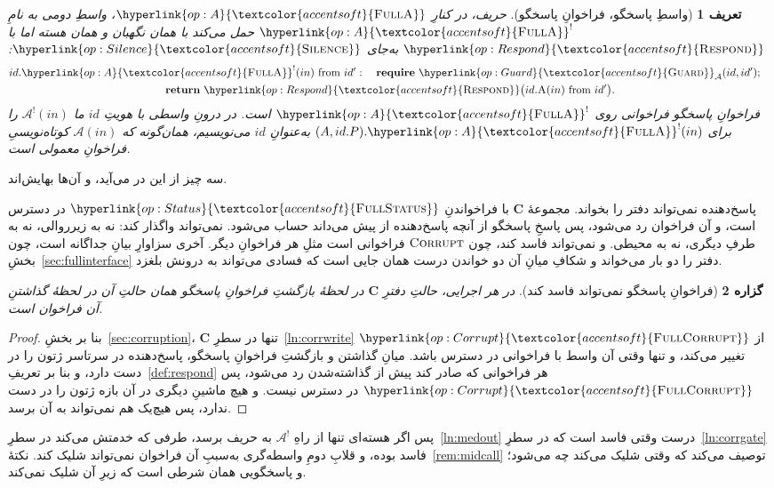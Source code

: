 \documentclass[10pt,oneside,openany]{book}
\newcommand{\Cs}{\mathbf{C}}
\newcommand{\Adv}{\mathcal{A}}
\newcommand{\op}[1]{\textnormal{\textsc{#1}}}
\newcommand{\opl}[1]{\hyperlink{op:#1}{\textcolor{accentsoft}{\op{#1}}}}
\newcommand{\fopl}[1]{\hyperlink{op:#1}{\textcolor{accentsoft}{\op{Full}\op{#1}}}}
\newcommand{\id}{id}
\theoremstyle{accentdef}
\newtheorem{definition}{تعریف}[chapter]
\theoremstyle{accentplain}
\newtheorem{proposition}[definition]{گزاره}
\begin{document}
\begin{definition}[واسطِ پاسخگو، فراخوانِ پاسخگو]\label{def:respcall}
حریف، در کنارِ $\fopl{A}$، واسطِ دومی به نامِ $\fopl{A}^{!}$ حمل می‌کند با
همان نگهبان و همان هسته اما با $\opl{Respond}$ به‌جای $\opl{Silence}$:
\[
  \begin{gathered}
  \id.\fopl{A}^{!}(in) \text{ from } \id'
  :\quad
  \textbf{require}\ \opl{Guard}_{\Adv}(\id,\id') ;\quad \\
  \textbf{return}\ \opl{Respond}\bigl(\id.\op{A}(in) \text{ from } \id'\bigr) .
  \end{gathered}
\]
\emph{فراخوانِ پاسخگو} فراخوانی روی $\fopl{A}^{!}$ است. در درونِ واسطی با
هویتِ $\id$ ما $\Adv^{!}(in)$ را برای $(A,\id.P).\fopl{A}^{!}(in)$ به‌عنوانِ
$\id$ می‌نویسیم، همان‌گونه که $\Adv(in)$ کوتاه‌نویسیِ فراخوانِ معمولی است.
\end{definition}

سه چیز از این در می‌آید، و آن‌ها بهایش‌اند.

پاسخ‌دهنده نمی‌تواند دفتر را بخواند. مجموعهٔ $\Cs$ با فراخواندنِ
$\fopl{Status}$ در دسترس است، و آن فراخوان رد می‌شود، پس پاسخِ پاسخگو از
آنچه پاسخ‌دهنده از پیش می‌داند حساب می‌شود. نمی‌تواند واگذار کند: نه به
زیرروالی، نه به طرفِ دیگری، نه به محیطی. و نمی‌تواند فاسد کند، چون
$\op{Corrupt}$ فراخوانی است مثلِ هر فراخوانِ دیگر. آخری سزاوارِ بیانِ
جداگانه است، چون بخشِ~\ref{sec:fullinterface} دفتر را دو بار می‌خواند و
شکافِ میانِ آن دو خواندن درست همان جایی است که فسادی می‌تواند به درونش
بلغزد.

\begin{proposition}[فراخوانِ پاسخگو نمی‌تواند فاسد کند]\label{prop:respcorr}
در هر اجرایی، حالتِ دفترِ $\Cs$ در لحظهٔ بازگشتِ فراخوانِ پاسخگو همان حالتِ
آن در لحظهٔ گذاشتنِ آن فراخوان است.
\end{proposition}

\begin{proof}
بنا بر بخشِ~\ref{sec:corruption}، $\Cs$ تنها در سطرِ~\ref{ln:corrwrite} از
$\fopl{Corrupt}$ تغییر می‌کند، و تنها وقتی آن واسط با فراخوانی در دسترس
باشد. میانِ گذاشتن و بازگشتِ فراخوانِ پاسخگو، پاسخ‌دهنده در سرتاسر ژتون را
در دست دارد، و بنا بر تعریفِ~\ref{def:respond} هر فراخوانی که صادر کند پیش
از گذاشته‌شدن رد می‌شود، پس $\fopl{Corrupt}$ در دسترس نیست. و هیچ ماشینِ
دیگری در آن بازه ژتون را در دست ندارد، پس هیچ‌یک هم نمی‌تواند به آن برسد.
\end{proof}

پس اگر هسته‌ای تنها از راهِ $\Adv^{!}$ به حریف برسد، طرفی که خدمتش می‌کند
در سطرِ~\ref{ln:medout} درست وقتی فاسد است که در سطرِ~\ref{ln:corrgate}
فاسد بوده، و قلابِ دومِ واسطه‌گری به‌سببِ آن فراخوان نمی‌تواند شلیک کند.
نکتهٔ~\ref{rem:midcall} توصیف می‌کند که وقتی شلیک می‌کند چه می‌شود؛ و
پاسخگویی همان شرطی است که زیرِ آن شلیک نمی‌کند.
\end{document}

